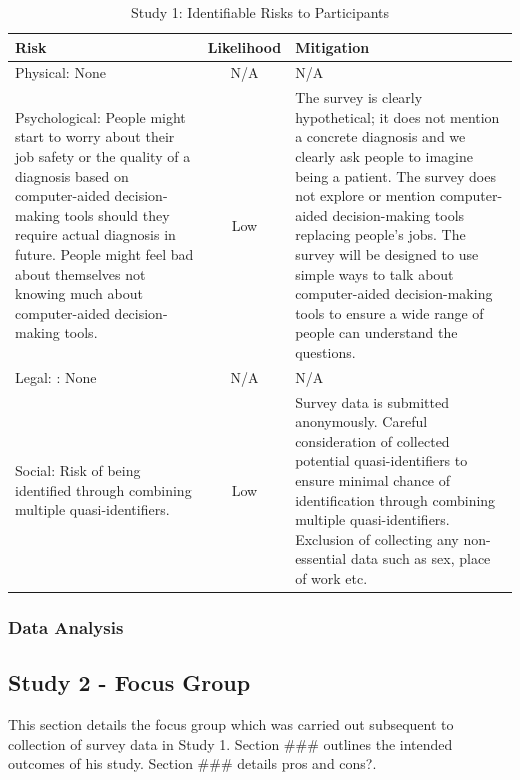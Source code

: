 \documentclass[manuscript,screen,review]{acmart}
\begin{document}
\begin{table}
\begin{center}
\begin{tabular}{ | p{6cm} | c | p{6cm} |}
\hline
 Risk & Likelihood & Mitigation \\
 \hline
 \hline
 Physical: None & N/A & N/A \\
 \hline
 Psychological: People might start to worry about their job safety or the quality of a diagnosis based on computer-aided decision-making tools should they require actual diagnosis in future. People might feel bad about themselves not knowing much about computer-aided decision-making tools. & Low & The survey is clearly hypothetical; it does not mention a concrete diagnosis and we clearly ask people to imagine being a patient. The survey does not explore or mention computer-aided decision-making tools replacing people's jobs. The survey will be designed to use simple ways to talk about computer-aided decision-making tools to ensure a wide range of people can understand the questions. \\
 \hline
 Legal: : None & N/A & N/A \\
 \hline
Social: Risk of being identified through combining multiple quasi-identifiers. & Low & Survey data is submitted anonymously. Careful consideration of collected potential quasi-identifiers to ensure minimal chance of identification through combining multiple quasi-identifiers. Exclusion of collecting any non-essential data such as sex, place of work etc.\\
\hline
\end{tabular}
\caption{Study 1: Identifiable Risks to Participants}
\label{table:study1_risks}
\end{center}
\end{table}






\subsubsection{Data Analysis}

\subsection{Study 2 - Focus Group}

This section details the focus group which was carried out subsequent to collection of survey data in Study 1. Section ### outlines the intended outcomes of his study. Section ### details pros and cons?.
\end{document}
